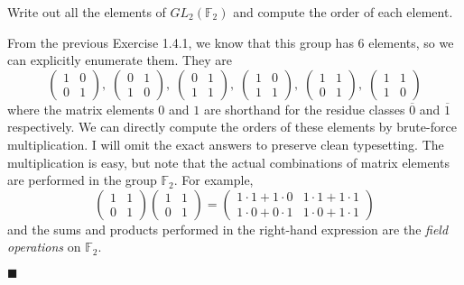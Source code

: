 \documentclass[12pt]{article}
\renewcommand{\qed}{\hfill$\blacksquare$}
\renewenvironment{proof}{\begin{addmargin}[1em]{0em}\begin{newproof}}{\end{newproof}\end{addmargin}\qed}
\newenvironment{problem}[2][Exercise]{\begin{trivlist}
\item[\hskip \labelsep {\bfseries #1}\hskip \labelsep {\bfseries #2.}]}{\end{trivlist}}
\begin{document}
\begin{problem}{1.4.2}
Write out all the elements of $GL_2\left(\mathbb{F}_2\right)$ and compute the order of each element.
\end{problem}
\begin{proof}
From the previous Exercise 1.4.1, we know that this group has 6 elements, so we can explicitly enumerate them. They are
\begin{equation*}
    \left(\begin{array}{cc} 1 & 0 \\ 0 & 1 \end{array}\right), \;
    \left(\begin{array}{cc} 0 & 1 \\ 1 & 0 \end{array}\right), \;
    \left(\begin{array}{cc} 0 & 1 \\ 1 & 1 \end{array}\right), \;
    \left(\begin{array}{cc} 1 & 0 \\ 1 & 1 \end{array}\right), \;
    \left(\begin{array}{cc} 1 & 1 \\ 0 & 1 \end{array}\right), \;
    \left(\begin{array}{cc} 1 & 1 \\ 1 & 0 \end{array}\right)
\end{equation*}
where the matrix elements $0$ and $1$ are shorthand for the residue classes $\overline{0}$ and $\overline{1}$ respectively. We can directly compute the orders of these elements by brute-force multiplication. I will omit the exact answers to preserve clean typesetting. The multiplication is easy, but note that the actual combinations of matrix elements are performed in the group $\mathbb{F}_2$. For example,
$$ \left( \begin{array}{cc} 1 & 1 \\ 0 & 1 \end{array}\right) \left( \begin{array}{cc} 1 & 1 \\ 0 & 1 \end{array}\right) = \left(\begin{array}{cc} 1\cdot 1 + 1\cdot 0 & 1\cdot 1 + 1\cdot 1 \\ 1\cdot 0 + 0\cdot 1 & 1\cdot 0 + 1\cdot 1 \end{array}\right) $$ and the sums and products performed in the right-hand expression are the \textit{field operations} on $\mathbb{F}_2$.
\end{proof}
\end{document}
